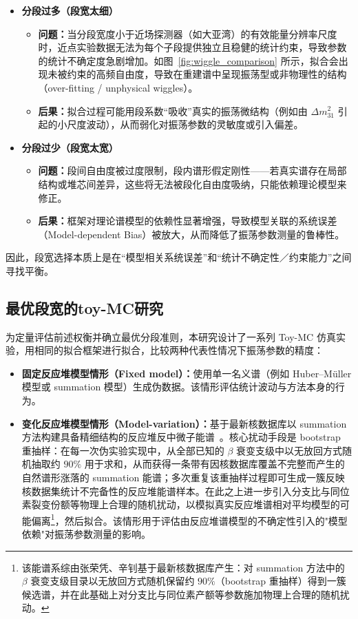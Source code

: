 \begin{itemize}
\item \textbf{分段过多（段宽太细）}
\begin{itemize}
\item \textbf{问题：}当分段宽度小于近场探测器（如大亚湾）的有效能量分辨率尺度时，近点实验数据无法为每个子段提供独立且稳健的统计约束，导致参数的统计不确定度急剧增加。如图~\ref{fig:wiggle_comparison} 所示，拟合会出现未被约束的高频自由度，导致在重建谱中呈现振荡型或非物理性的结构（over-fitting / unphysical wiggles）。
\item \textbf{后果：}拟合过程可能用段系数“吸收”真实的振荡微结构（例如由 $\Delta m^2_{31}$ 引起的小尺度波动），从而弱化对振荡参数的灵敏度或引入偏差。
\end{itemize}
\item \textbf{分段过少（段宽太宽）}
\begin{itemize}
\item \textbf{问题：}段间自由度被过度限制，段内谱形假定刚性——若真实谱存在局部结构或堆芯间差异，这些将无法被段化自由度吸纳，只能依赖理论模型来修正。
\item \textbf{后果：}框架对理论谱模型的依赖性显著增强，导致模型关联的系统误差（Model-dependent Bias）被放大，从而降低了振荡参数测量的鲁棒性。
\end{itemize}
\end{itemize}

因此，段宽选择本质上是在“模型相关系统误差”和“统计不确定性／约束能力”之间寻找平衡。

\subsection{最优段宽的toy-MC研究}
\label{sec:optimal_segment_toymc}

为定量评估前述权衡并确立最优分段准则，本研究设计了一系列 Toy-MC 仿真实验，用相同的拟合框架进行拟合，比较两种代表性情况下振荡参数的精度：

\begin{itemize}
\item \textbf{固定反应堆模型情形（Fixed model）：}使用单一名义谱（例如 Huber--Müller 模型或 summation 模型）生成伪数据。该情形评估统计波动与方法本身的行为。
\item \textbf{变化反应堆模型情形（Model-variation）：}基于最新核数据库以 summation 方法构建具备精细结构的反应堆反中微子能谱~\cite{Xin2023_Thesis,Fallot2012_Summation,Estienne2019Summation}。核心扰动手段是 bootstrap 重抽样：在每一次伪实验实现中，从全部已知的 $\beta$ 衰变支级中以无放回方式随机抽取约 $90\%$ 用于求和，从而获得一条带有因核数据库覆盖不完整而产生的自然谱形涨落的 summation 能谱；多次重复该重抽样过程即可生成一簇反映核数据集统计不完备性的反应堆能谱样本。在此之上进一步引入分支比与同位素裂变份额等物理上合理的随机扰动，以模拟真实反应堆谱相对平均模型的可能偏离\footnote{该能谱系综由张荣凭、辛钊基于最新核数据库产生：对 summation 方法中的 $\beta$ 衰变支级目录以无放回方式随机保留约 $90\%$（bootstrap 重抽样）得到一簇候选谱，并在此基础上对分支比与同位素产额等参数施加物理上合理的随机扰动。}，然后拟合。该情形用于评估由反应堆谱模型的不确定性引入的"模型依赖"对振荡参数测量的影响。
\end{itemize}

